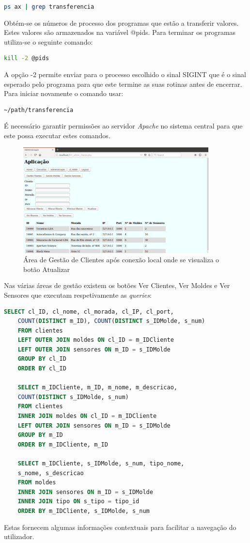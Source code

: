 \documentclass[11pt,twoside,a4paper]{report}
\begin{document}
\begin{lstlisting}[language = bash]
	ps ax | grep transferencia
\end{lstlisting}
Obtém-se os números de processo dos programas que estão a transferir valores. Estes valores são armazenados na variável @pids. Para terminar os programas utiliza-se o seguinte comando:
\begin{lstlisting}[language = bash]
	kill -2 @pids
\end{lstlisting}
A opção -2 permite enviar para o processo escolhido o sinal SIGINT que é o sinal esperado pelo programa para que este termine as suas rotinas antes de encerrar. Para iniciar novamente o comando usar:
\begin{lstlisting}[language = bash]
	~/path/transferencia
\end{lstlisting}
É necessário garantir permissões ao servidor \textit{Apache} no sistema central para que este possa executar estes comandos.
\newpage
\begin{figure}[H]
	\centering
			\includegraphics[width=0.9\textwidth]{administracao04} %
	\caption{Área de Gestão de Clientes após conexão local onde se visualiza o botão Atualizar}
	\label{fig:admin7}
\end{figure}
Nas várias áreas de gestão existem os botões Ver Clientes, Ver Moldes e Ver Sensores que executam respetivamente as \textit{queries}:
\begin{lstlisting}[language = SQL]
	SELECT cl_ID, cl_nome, cl_morada, cl_IP, cl_port,
	COUNT(DISTINCT m_ID), COUNT(DISTINCT s_IDMolde, s_num)
	FROM clientes
	LEFT OUTER JOIN moldes ON cl_ID = m_IDCliente
	LEFT OUTER JOIN sensores ON m_ID = s_IDMolde
	GROUP BY cl_ID
	ORDER BY cl_ID
	
	SELECT m_IDCliente, m_ID, m_nome, m_descricao,
	COUNT(DISTINCT s_IDMolde, s_num)
	FROM clientes
	INNER JOIN moldes ON cl_ID = m_IDCliente
	LEFT OUTER JOIN sensores ON m_ID = s_IDMolde
	GROUP BY m_ID
	ORDER BY m_IDCliente, m_ID
	
	SELECT m_IDCliente, s_IDMolde, s_num, tipo_nome,
	s_nome, s_descricao
	FROM moldes
	INNER JOIN sensores ON m_ID = s_IDMolde
	INNER JOIN tipo ON s_tipo = tipo_id
	ORDER BY m_IDCliente, s_IDMolde, s_num
\end{lstlisting}
Estas fornecem algumas informações contextuais para facilitar a navegação do utilizador.
\end{document}
